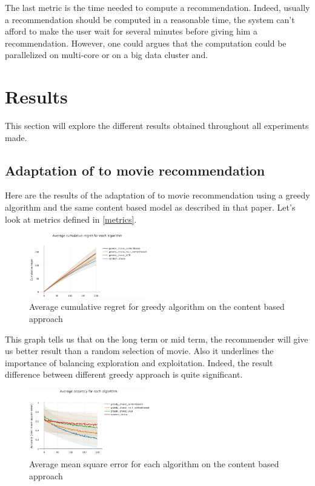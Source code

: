 \documentclass[letterpaper]{article}
\begin{document}
The last metric is the time needed to compute a recommendation. Indeed, usually a recommendation should be computed in a reasonable time, the system can't afford to make the user wait for several minutes before giving him a recommendation. However, one could argues that the computation could be parallelized on multi-core or on a big data cluster and.  


\section{Results} \label{results}

This section will explore the different results obtained throughout all experiments made.

\subsection{Adaptation of \cite{main} to movie recommendation}

Here are the results of the adaptation of \cite{main} to movie recommendation using a greedy algorithm and the same content based model as described in that paper. Let's look at metrics defined in \ref{metrics}.

\begin{figure}[H]
\begin{center}
\includegraphics[width=0.47\textwidth]{img/greedy0.png}
\caption{Average cumulative regret for greedy algorithm on the content based approach}
\label{greedy0}
\end{center}
\end{figure}

This graph tells us that on the long term or mid term, the recommender will give us better result than a random selection of movie. Also it underlines the importance of balancing exploration and exploitation. Indeed, the result difference between different greedy approach is quite significant.

\begin{figure}[H]
\begin{center}
\includegraphics[width=0.47\textwidth]{img/greedy1.png}
\caption{Average mean square error for each algorithm on the content based approach}
\label{greedy1}
\end{center}
\end{figure}
\end{document}
